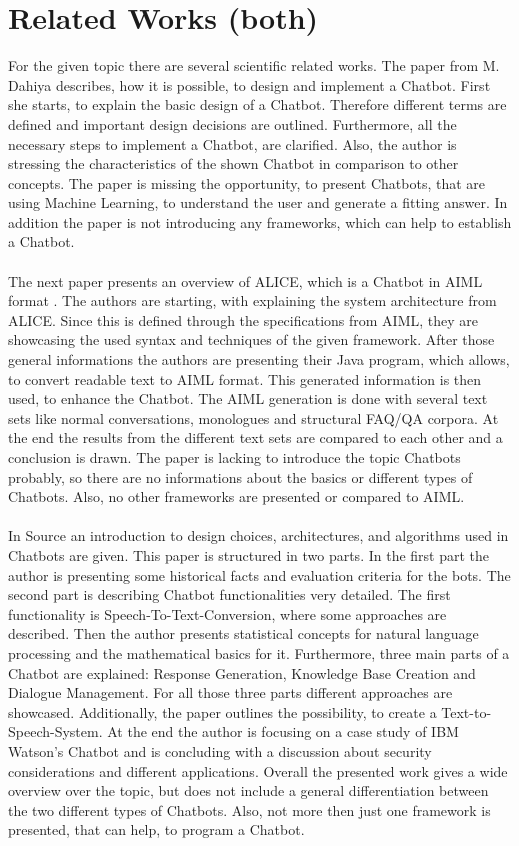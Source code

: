 \documentclass[10pt,final,journal,a4paper,oneside,twocolumn]{IEEEtran}
\begin{document}
\section{Related Works (both)}
For the given topic there are several scientific related works. The paper from M. Dahiya \cite{b3} describes, how it is possible, to design and implement a Chatbot. First she starts, to explain the basic design of a Chatbot. Therefore different terms are defined and important design decisions are outlined. Furthermore, all the necessary steps to implement a Chatbot, are clarified. Also, the author is stressing the characteristics of the shown Chatbot in comparison to other concepts. The paper is missing the opportunity, to present Chatbots, that are using Machine Learning, to understand the user and generate a fitting answer. In addition the paper is not introducing any frameworks, which can help to establish a Chatbot.\\
\\
The next paper presents an overview of ALICE, which is a Chatbot in AIML format \cite{b5}. The authors are starting, with explaining the system architecture from ALICE. Since this is defined through the specifications from AIML, they are showcasing the used syntax and techniques of the given framework. After those general informations the authors are presenting their Java program, which allows, to convert readable text to AIML format. This generated information is then used, to enhance the Chatbot. The AIML generation is done with several text sets like normal conversations, monologues and structural FAQ/QA corpora. At the end the results from the different text sets are compared to each other and a conclusion is drawn. The paper is lacking to introduce the topic Chatbots probably, so there are no informations about the basics or different types of Chatbots. Also, no other frameworks are presented or compared to AIML.\\
\\
In Source \cite{b6} an introduction to design choices, architectures, and algorithms used in Chatbots are given. This paper is structured in two parts. In the first part the author is presenting some historical facts and evaluation criteria for the bots. The second part is describing Chatbot functionalities very detailed. The first functionality is Speech-To-Text-Conversion, where some approaches are described. Then the author presents statistical concepts for natural language processing and the mathematical basics for it. Furthermore, three main parts of a Chatbot are explained: Response Generation, Knowledge Base Creation and Dialogue Management. For all those three parts different approaches are showcased. Additionally, the paper outlines the possibility, to create a Text-to-Speech-System. At the end the author is focusing on a case study of IBM Watson’s Chatbot and is concluding with a discussion about security considerations and different applications. Overall the presented work gives a wide overview over the topic, but does not include a general differentiation between the two different types of Chatbots. Also, not more then just one framework is presented, that can help, to program a Chatbot.
\end{document}
